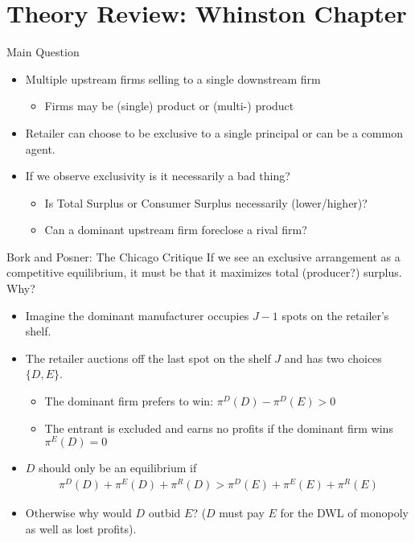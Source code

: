 


\section{Theory Review: Whinston Chapter}

\begin{frame}{Main Question}
\begin{itemize}
\item Multiple upstream firms selling to a single downstream firm
\begin{itemize}
\item Firms may be (single) product or (multi-) product
\end{itemize}
\item Retailer can choose to be \alert{exclusive} to a single principal or can be a \alert{common agent}.
\item If we observe \alert{exclusivity} is it necessarily a bad thing?
\begin{itemize}
\item Is Total Surplus or Consumer Surplus necessarily (lower/higher)?
\item Can a dominant upstream firm \alert{foreclose} a rival firm?
\end{itemize}
\end{itemize}
\end{frame}


\begin{frame}{Bork and Posner: The Chicago Critique}
If we see an exclusive arrangement as a competitive \alert{equilibrium}, it must be that it maximizes total (producer?) surplus. Why?
\begin{itemize}
\item Imagine the dominant manufacturer occupies $J-1$ spots on the retailer's shelf.
\item The retailer auctions off the last spot on the shelf $J$ and has two choices $\{D,E\}$.
\begin{itemize}
\item The dominant firm prefers to win: $\pi^D(D) -\pi^D(E) > 0$
\item The entrant is excluded and earns no profits if the dominant firm wins  $\pi^E(D)= 0$
\end{itemize}
\item $D$ should only be an equilibrium if
\begin{align*}
\pi^D(D) + \pi^E(D) + \pi^R(D) > \pi^D(E) + \pi^E(E) + \pi^R(E)
\end{align*}
\item Otherwise why would $D$ outbid $E$? ($D$ must pay $E$ for the DWL of monopoly as well as lost profits).
\end{itemize}
\end{frame}


